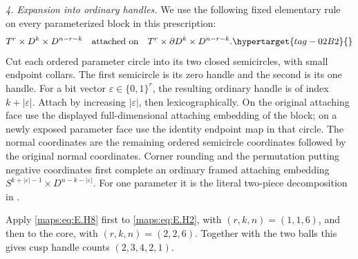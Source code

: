 \begin{theorem}
\emph{4. Expansion into ordinary handles.}
We use the following fixed elementary rule on every parameterized
block in this prescription:
\begin{equation}
 T^r\times D^k\times D^{n-r-k}
 \quad\hbox{attached on}\quad
 T^r\times\partial D^k\times D^{n-r-k}.
 \hypertarget{tag-02B2}{}\label{maps:eq:E.H8}
\end{equation}
Cut each ordered parameter circle into its two closed semicircles,
with small endpoint collars.  The first semicircle is its zero
handle and the second is its one handle.  For a bit vector
$\varepsilon\in\{0,1\}^r$, the resulting ordinary handle is of
index $k+|\varepsilon|$.  Attach by increasing $|\varepsilon|$,
then lexicographically.  On the original attaching face use
the displayed full-dimensional attaching embedding of the block;
on a newly exposed parameter face use the identity endpoint map
in that circle.  The normal coordinates are the remaining ordered
semicircle coordinates followed by the original normal coordinates.
Corner rounding and the permutation putting negative coordinates
first complete an ordinary framed attaching embedding
$S^{k+|\varepsilon|-1}\times D^{n-k-|\varepsilon|}$.
  For one parameter
it is the literal two-piece decomposition in
\cite[Section~4.1, equation~(16), p.~103]{mapsVogel09}.


Apply \eqref{maps:eq:E.H8} first to \eqref{maps:eq:E.H2}, with $(r,k,n)=(1,1,6)$, and then
to the core, with $(r,k,n)=(2,2,6)$.  Together with the two balls
this gives cusp handle counts $(2,3,4,2,1)$.


\end{theorem}
